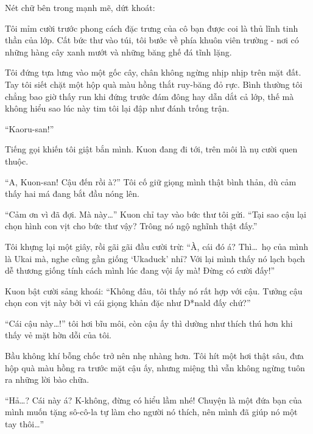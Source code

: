 \documentclass[../main.tex]{subfiles}
\begin{document}
Nét chữ bên trong mạnh mẽ, dứt khoát:


Tôi mỉm cười trước phong cách đặc trưng của cô bạn được coi là thủ lĩnh tinh thần của lớp. Cất bức thư vào túi, tôi bước về phía khuôn viên trường - nơi có những hàng cây xanh mướt và những băng ghế đá tĩnh lặng.

\ct


Tôi đứng tựa lưng vào một gốc cây, chân không ngừng nhịp nhịp trên mặt đất. Tay tôi siết chặt một hộp quà màu hồng thắt ruy-băng đỏ rực. Bình thường tôi chẳng bao giờ thấy run khi đứng trước đám đông hay dẫn dắt cả lớp, thế mà không hiểu sao lúc này tim tôi lại đập như đánh trống trận.

``Kaoru-san!''

Tiếng gọi khiến tôi giật bắn mình. Kuon đang đi tới, trên môi là nụ cười quen thuộc.

``A, Kuon-san! Cậu đến rồi à?'' Tôi cố giữ giọng mình thật bình thản, dù cảm thấy hai má đang bắt đầu nóng lên.

``Cảm ơn vì đã đợi. Mà này\dots'' Kuon chỉ tay vào bức thư tôi gửi. ``Tại sao cậu lại chọn hình con vịt cho bức thư vậy? Trông nó ngộ nghĩnh thật đấy.''

Tôi khựng lại một giây, rồi gãi gãi đầu cười trừ: ``À, cái đó á? Thì\dots\ họ của mình là Ukai mà, nghe cũng gần giống `Ukaduck' nhỉ? Với lại mình thấy nó lạch bạch dễ thương giống tính cách mình lúc đang vội ấy mà! Đừng có cười đấy!''

Kuon bật cười sảng khoái: ``Không đâu, tôi thấy nó rất hợp với cậu. Tưởng cậu chọn con vịt này bởi vì cái giọng khản đặc như D*nald đấy chứ?''

``Cái cậu này\dots!'' tôi hơi bĩu môi, còn cậu ấy thì dường như thích thú hơn khi thấy vẻ mặt hờn dỗi của tôi.

Bầu không khí bỗng chốc trở nên nhẹ nhàng hơn. Tôi hít một hơi thật sâu, đưa hộp quà màu hồng ra trước mặt cậu ấy, nhưng miệng thì vẫn không ngừng tuôn ra những lời bào chữa.

``Hả\dots? Cái này á? K-không, đừng có hiểu lầm nhé! Chuyện là một đứa bạn của mình muốn tặng sô-cô-la tự làm cho người nó thích, nên mình đã giúp nó một tay thôi\dots''
\end{document}
